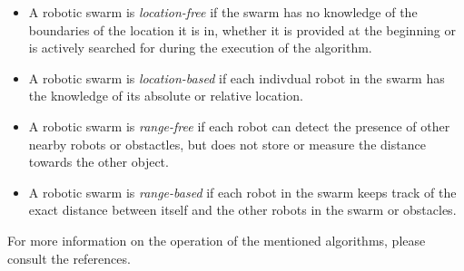   \begin{itemize}
    \item A robotic swarm is \emph{location-free} if the swarm has no knowledge of the boundaries of the location it is in, whether it is provided at the beginning or is actively searched for during the execution of the algorithm. 
    \item A robotic swarm is \emph{location-based} if each indivdual robot in the swarm has the knowledge of its absolute or relative location.
    \item A robotic swarm is \emph{range-free} if each robot can detect the presence of other nearby robots or obstactles, but does not store or measure the distance towards the other object.
    \item A robotic swarm is \emph{range-based} if each robot in the swarm keeps track of the exact distance between itself and the other robots in the swarm or obstacles. 
  \end{itemize}
  For more information on the operation of the mentioned algorithms, please consult the references. 

